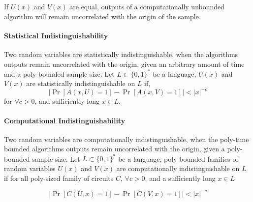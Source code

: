 If $U(x)$ and $V(x)$ are equal, outputs of a computationally unbounded algorithm will remain uncorrelated with the origin of the sample.

\paragraph{Statistical Indistinguishability} Two random variables are statistically indistinguishable, when the algorithms outputs remain uncorrelated with the origin, given an arbitrary amount of time and a poly-bounded sample size.
\bigskip
\newline
Let $L \subset \{0,1\}^*$ be a language, $U(x)$ and $V(x)$ are statistically indistinguishable on $L$ if,
\bigskip
$$|\Pr [A(x, U) = 1] - \Pr [A(x, V) = 1]| < |x|^{-c}$$ %
\bigskip
\newline
for $\forall c > 0$, and sufficiently long $x \in L$. 

%
%
%
%
%
%

\paragraph{Computational Indistinguishability} %
Two random variables are computationally indistinguishable, when the poly-time bounded algorithms outputs remain uncorrelated with the origin, given a poly-bounded sample size.
\bigskip
\newline
Let $L \subset \{0,1\}^*$ be a language, poly-bounded families of random variables $U(x)$ and $V(x)$ are computationally indistinguishable on $L$ if for all poly-sized family of circuits $C$, $\forall c > 0$, and a sufficiently long $x \in L$

$$|\Pr[C(U, x) = 1] - \Pr[C(V, x) = 1]|  < |x|^{-c}$$


%
%
%
%
%

